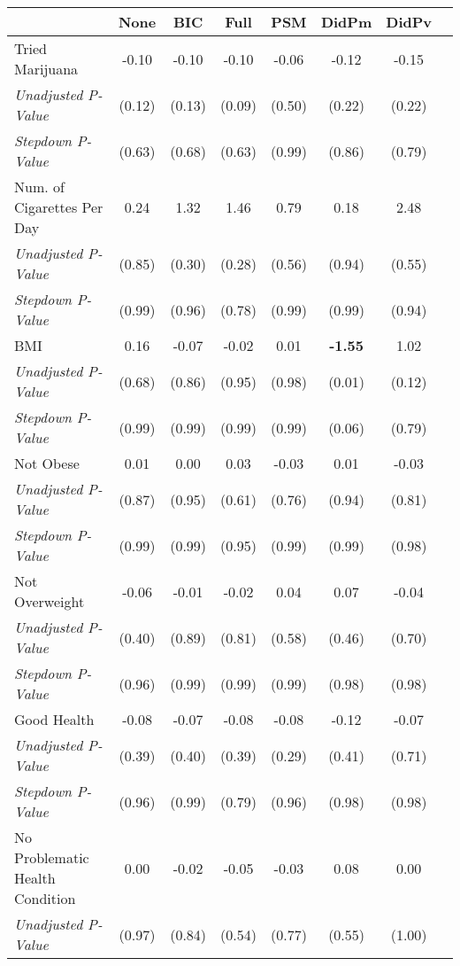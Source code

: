 \begin{tabular}{l c c c c c c c}
\toprule
 & None & BIC & Full & PSM & DidPm & DidPv \\
\midrule
Tried Marijuana & -0.10 & -0.10 & -0.10 & -0.06 & -0.12 & -0.15 \\
\quad \textit{Unadjusted P-Value} & (0.12) & (0.13) & (0.09) & (0.50) & (0.22) & (0.22) \\
\quad \textit{Stepdown P-Value} & (0.63) & (0.68) & (0.63) & (0.99) & (0.86) & (0.79) \\
Num. of Cigarettes Per Day & 0.24 & 1.32 & 1.46 & 0.79 & 0.18 & 2.48 \\
\quad \textit{Unadjusted P-Value} & (0.85) & (0.30) & (0.28) & (0.56) & (0.94) & (0.55) \\
\quad \textit{Stepdown P-Value} & (0.99) & (0.96) & (0.78) & (0.99) & (0.99) & (0.94) \\
BMI & 0.16 & -0.07 & -0.02 & 0.01 & \textbf{ -1.55 } & 1.02 \\
\quad \textit{Unadjusted P-Value} & (0.68) & (0.86) & (0.95) & (0.98) & (0.01) & (0.12) \\
\quad \textit{Stepdown P-Value} & (0.99) & (0.99) & (0.99) & (0.99) & (0.06) & (0.79) \\
Not Obese & 0.01 & 0.00 & 0.03 & -0.03 & 0.01 & -0.03 \\
\quad \textit{Unadjusted P-Value} & (0.87) & (0.95) & (0.61) & (0.76) & (0.94) & (0.81) \\
\quad \textit{Stepdown P-Value} & (0.99) & (0.99) & (0.95) & (0.99) & (0.99) & (0.98) \\
Not Overweight & -0.06 & -0.01 & -0.02 & 0.04 & 0.07 & -0.04 \\
\quad \textit{Unadjusted P-Value} & (0.40) & (0.89) & (0.81) & (0.58) & (0.46) & (0.70) \\
\quad \textit{Stepdown P-Value} & (0.96) & (0.99) & (0.99) & (0.99) & (0.98) & (0.98) \\
Good Health & -0.08 & -0.07 & -0.08 & -0.08 & -0.12 & -0.07 \\
\quad \textit{Unadjusted P-Value} & (0.39) & (0.40) & (0.39) & (0.29) & (0.41) & (0.71) \\
\quad \textit{Stepdown P-Value} & (0.96) & (0.99) & (0.79) & (0.96) & (0.98) & (0.98) \\
No Problematic Health Condition & 0.00 & -0.02 & -0.05 & -0.03 & 0.08 & 0.00 \\
\quad \textit{Unadjusted P-Value} & (0.97) & (0.84) & (0.54) & (0.77) & (0.55) & (1.00) \\

\end{tabular}
